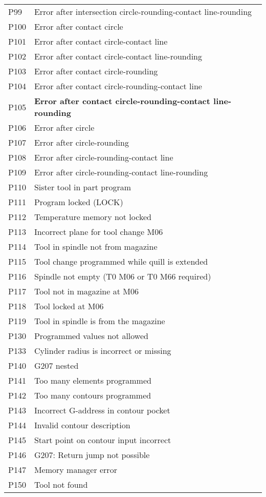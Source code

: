 \documentclass[openany,11pt]{book}
\begin{document}
\newpage

\begin{table}[!h]
    \begin{tabular}{ll}
    P99  & Error after intersection circle-rounding-contact line-rounding \\
    P100 & Error after contact circle \\
    P101 & Error after contact circle-contact line \\
    P102 & Error after contact circle-contact line-rounding \\
    P103 & Error after contact circle-rounding \\
    P104 & Error after contact circle-rounding-contact line \\
    P105 & \textbf{Error after contact circle-rounding-contact line-rounding} \\
    P106 & Error after circle \\
    P107 & Error after circle-rounding \\
    P108 & Error after circle-rounding-contact line \\
    P109 & Error after circle-rounding-contact line-rounding \\
    P110 & Sister tool in part program \\
    P111 & Program locked (LOCK) \\
    P112 & Temperature memory not locked \\
    P113 & Incorrect plane for tool change M06 \\
    P114 & Tool in spindle not from magazine \\
    P115 & Tool change programmed while quill is extended \\
    P116 & Spindle not empty (T0 M06 or T0 M66 required) \\
    P117 & Tool not in magazine at M06 \\
    P118 & Tool locked at M06 \\
    P119 & Tool in spindle is from the magazine \\
    P130 & Programmed values not allowed \\
    P133 & Cylinder radius is incorrect or missing \\
    P140 & G207 nested \\
    P141 & Too many elements programmed \\
    P142 & Too many contours programmed \\
    P143 & Incorrect G-address in contour pocket \\
    P144 & Invalid contour description \\
    P145 & Start point on contour input incorrect \\
    P146 & G207: Return jump not possible \\
    P147 & Memory manager error \\
    P150 & Tool not found \\
    \end{tabular}
\end{table}
\end{document}
